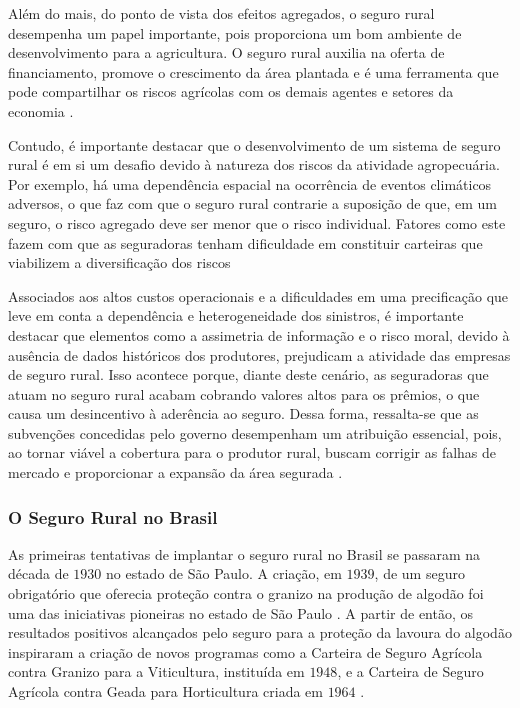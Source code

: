 \documentclass[
	12pt,				%
	openright,			%
	oneside,			%
	a4paper,			%
	chapter=TITLE,		%
	section=TITLE,		%
	english,			%
	french,				%
	spanish,			%
	brazil				%
	]{abntex2}
\begin{document}
Além do mais, do ponto de vista dos efeitos agregados, o seguro rural desempenha um papel importante, pois proporciona um bom ambiente de desenvolvimento para a agricultura. O seguro rural auxilia na oferta de financiamento, promove o crescimento da área plantada e é uma ferramenta que pode compartilhar os riscos agrícolas com os demais agentes e setores da economia \cite{brasil21}.

Contudo, é importante destacar que o desenvolvimento de um sistema de seguro rural é em si um desafio devido à natureza dos riscos da atividade agropecuária. Por exemplo, há uma dependência espacial na ocorrência de eventos climáticos adversos, o que faz com que o seguro rural contrarie a suposição de que, em um seguro, o risco agregado deve ser menor que o risco individual. Fatores como este fazem com que as seguradoras tenham dificuldade em constituir carteiras que viabilizem a diversificação dos riscos \cite{barros12, fornazier12}

Associados aos altos custos operacionais e a dificuldades em uma precificação que leve em conta a dependência e heterogeneidade dos sinistros, é importante destacar que elementos como a assimetria de informação e o risco moral, devido à ausência de dados históricos dos produtores, prejudicam a atividade das empresas de seguro rural. Isso acontece porque, diante deste cenário, as seguradoras que atuam no seguro rural acabam cobrando valores altos para os prêmios, o que causa um desincentivo à aderência ao seguro. Dessa forma, ressalta-se que as subvenções concedidas pelo governo desempenham um atribuição essencial, pois, ao tornar viável a cobertura para o produtor rural, buscam corrigir as falhas de mercado e proporcionar a expansão da área segurada \cite{guimaraes09, barros12}.

\subsubsection{O Seguro Rural no Brasil}

As primeiras tentativas de implantar o seguro rural no Brasil se passaram na década de $1930$ no estado de São Paulo. A criação, em $1939$, de um seguro obrigatório que oferecia proteção contra o granizo na produção de algodão foi uma das iniciativas pioneiras no estado de São Paulo \cite{maia11}. A partir de então, os resultados positivos alcançados pelo seguro para a proteção da lavoura do algodão inspiraram a criação de novos programas como a Carteira de Seguro Agrícola contra Granizo para a Viticultura, instituída em $1948$, e a Carteira de Seguro Agrícola contra Geada para Horticultura criada em $1964$ \cite{silva14}.
\end{document}
